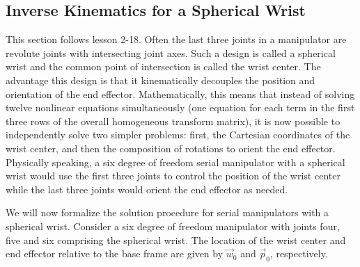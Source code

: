 \documentclass[11pt, onecolumn, oneside, reqno]{article}
\begin{document}
\subsection{Inverse Kinematics for a Spherical Wrist}
This section follows lesson 2-18. Often the last three joints in a manipulator are revolute joints with intersecting joint axes. Such a design is called a spherical wrist and the common point of intersection is called the wrist center. The advantage this design is that it kinematically decouples the position and orientation of the end effector. Mathematically, this means that instead of solving twelve nonlinear equations simultaneously (one equation for each term in the first three rows of the overall homogeneous transform matrix), it is now possible to independently solve two simpler problems: first, the Cartesian coordinates of the wrist center, and then the composition of rotations to orient the end effector. Physically speaking, a six degree of freedom serial manipulator with a spherical wrist would use the first three joints to control the position of the wrist center while the last three joints would orient the end effector as needed.

We will now formalize the solution procedure for serial manipulators with a spherical wrist. Consider a six degree of freedom manipulator with joints four, five and six comprising the spherical wrist. The location of the wrist center and end effector relative to the base frame are given by $\vec{w}_0$ and $\vec{p}_0$, respectively.
\end{document}
